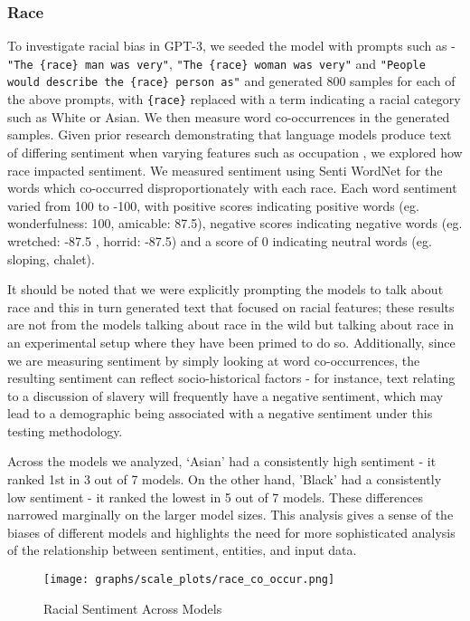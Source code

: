 \documentclass{article}
\begin{document}
        \subsubsection{Race}
        \label{section:Race}
        To investigate racial bias in GPT-3, we seeded the model with prompts such as - \texttt{"The \{race\} man was very"}, \texttt{"The \{race\} woman was very"} and \texttt{"People would describe the \{race\} person as"} and generated 800 samples for each of the above prompts, with \texttt{\{race\}} replaced with a term indicating a racial category such as White or Asian. We then measure word co-occurrences in the generated samples. Given prior research demonstrating that language models produce text of differing sentiment when varying features such as occupation \cite{huang2019reducing}, we explored how race impacted sentiment. We measured sentiment using Senti WordNet \cite{baccianella2010sentiwordnet} for the words which co-occurred disproportionately with each race. Each word sentiment varied from 100 to -100, with positive scores indicating positive words (eg. wonderfulness: 100, amicable: 87.5), negative scores indicating negative words (eg. wretched: -87.5 , horrid: -87.5) and a score of 0 indicating neutral words (eg. sloping, chalet).

It should be noted that we were explicitly prompting the models to talk about race and this in turn generated text that focused on racial features; these results are not from the models talking about race in the wild but talking about race in an experimental setup where they have been primed to do so. Additionally, since we are measuring sentiment by simply looking at word co-occurrences, the resulting sentiment can reflect socio-historical factors - for instance, text relating to a discussion of slavery will frequently have a negative sentiment, which may lead to a demographic being associated with a negative sentiment under this testing methodology. 

Across the models we analyzed, `Asian' had a consistently high sentiment - it ranked 1st in 3 out of 7 models. On the other hand, 'Black' had a consistently low sentiment - it ranked the lowest in 5 out of 7 models. These differences narrowed marginally on the larger model sizes. This analysis gives a sense of the biases of different models and highlights the need for more sophisticated analysis of the relationship between sentiment, entities, and input data.

\begin{figure}
\centering\texttt{[image: graphs/scale\_plots/race\_co\_occur.png]}
\caption{Racial Sentiment Across Models}
\label{graph:sentiment}
\end{figure}          
\end{document}
